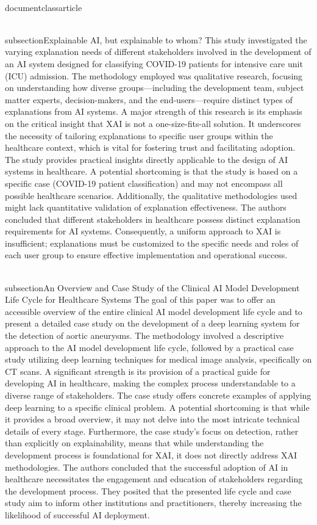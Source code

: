 \\documentclass{article}
\begin{document}
\\subsection{Explainable AI, but explainable to whom?}
This study investigated the varying explanation needs of different stakeholders involved in the development of an AI system designed for classifying COVID-19 patients for intensive care unit (ICU) admission. The methodology employed was qualitative research, focusing on understanding how diverse groups—including the development team, subject matter experts, decision-makers, and the end-users—require distinct types of explanations from AI systems. A major strength of this research is its emphasis on the critical insight that XAI is not a one-size-fits-all solution. It underscores the necessity of tailoring explanations to specific user groups within the healthcare context, which is vital for fostering trust and facilitating adoption. The study provides practical insights directly applicable to the design of AI systems in healthcare. A potential shortcoming is that the study is based on a specific case (COVID-19 patient classification) and may not encompass all possible healthcare scenarios. Additionally, the qualitative methodologies used might lack quantitative validation of explanation effectiveness. The authors concluded that different stakeholders in healthcare possess distinct explanation requirements for AI systems. Consequently, a uniform approach to XAI is insufficient; explanations must be customized to the specific needs and roles of each user group to ensure effective implementation and operational success.

\\subsection{An Overview and Case Study of the Clinical AI Model Development Life Cycle for Healthcare Systems}
The goal of this paper was to offer an accessible overview of the entire clinical AI model development life cycle and to present a detailed case study on the development of a deep learning system for the detection of aortic aneurysms. The methodology involved a descriptive approach to the AI model development life cycle, followed by a practical case study utilizing deep learning techniques for medical image analysis, specifically on CT scans. A significant strength is its provision of a practical guide for developing AI in healthcare, making the complex process understandable to a diverse range of stakeholders. The case study offers concrete examples of applying deep learning to a specific clinical problem. A potential shortcoming is that while it provides a broad overview, it may not delve into the most intricate technical details of every stage. Furthermore, the case study's focus on detection, rather than explicitly on explainability, means that while understanding the development process is foundational for XAI, it does not directly address XAI methodologies. The authors concluded that the successful adoption of AI in healthcare necessitates the engagement and education of stakeholders regarding the development process. They posited that the presented life cycle and case study aim to inform other institutions and practitioners, thereby increasing the likelihood of successful AI deployment.
\end{document}
